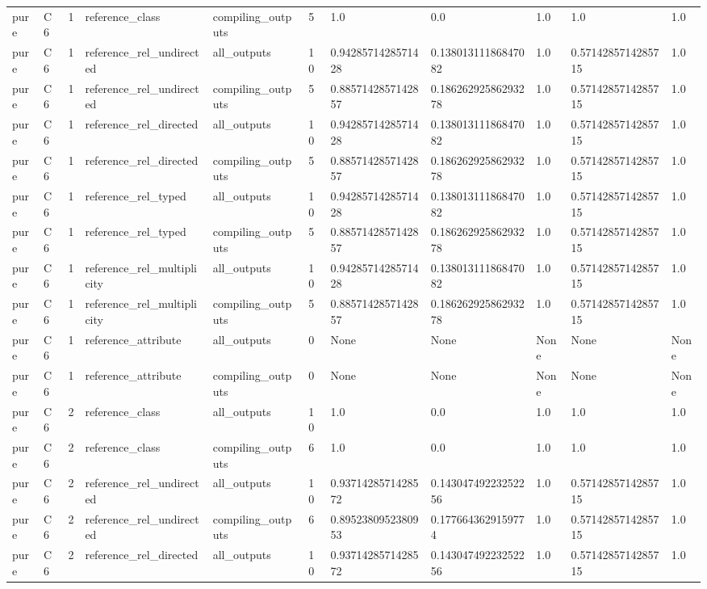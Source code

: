 \begin{tabular}{lllllllllll}
pure & C6 & 1 & reference\_class & compiling\_outputs & 5 & 1.0 & 0.0 & 1.0 & 1.0 & 1.0 \\
pure & C6 & 1 & reference\_rel\_undirected & all\_outputs & 10 & 0.9428571428571428 & 0.13801311186847082 & 1.0 & 0.5714285714285715 & 1.0 \\
pure & C6 & 1 & reference\_rel\_undirected & compiling\_outputs & 5 & 0.8857142857142857 & 0.18626292586293278 & 1.0 & 0.5714285714285715 & 1.0 \\
pure & C6 & 1 & reference\_rel\_directed & all\_outputs & 10 & 0.9428571428571428 & 0.13801311186847082 & 1.0 & 0.5714285714285715 & 1.0 \\
pure & C6 & 1 & reference\_rel\_directed & compiling\_outputs & 5 & 0.8857142857142857 & 0.18626292586293278 & 1.0 & 0.5714285714285715 & 1.0 \\
pure & C6 & 1 & reference\_rel\_typed & all\_outputs & 10 & 0.9428571428571428 & 0.13801311186847082 & 1.0 & 0.5714285714285715 & 1.0 \\
pure & C6 & 1 & reference\_rel\_typed & compiling\_outputs & 5 & 0.8857142857142857 & 0.18626292586293278 & 1.0 & 0.5714285714285715 & 1.0 \\
pure & C6 & 1 & reference\_rel\_multiplicity & all\_outputs & 10 & 0.9428571428571428 & 0.13801311186847082 & 1.0 & 0.5714285714285715 & 1.0 \\
pure & C6 & 1 & reference\_rel\_multiplicity & compiling\_outputs & 5 & 0.8857142857142857 & 0.18626292586293278 & 1.0 & 0.5714285714285715 & 1.0 \\
pure & C6 & 1 & reference\_attribute & all\_outputs & 0 & None & None & None & None & None \\
pure & C6 & 1 & reference\_attribute & compiling\_outputs & 0 & None & None & None & None & None \\
pure & C6 & 2 & reference\_class & all\_outputs & 10 & 1.0 & 0.0 & 1.0 & 1.0 & 1.0 \\
pure & C6 & 2 & reference\_class & compiling\_outputs & 6 & 1.0 & 0.0 & 1.0 & 1.0 & 1.0 \\
pure & C6 & 2 & reference\_rel\_undirected & all\_outputs & 10 & 0.9371428571428572 & 0.14304749223252256 & 1.0 & 0.5714285714285715 & 1.0 \\
pure & C6 & 2 & reference\_rel\_undirected & compiling\_outputs & 6 & 0.8952380952380953 & 0.1776643629159774 & 1.0 & 0.5714285714285715 & 1.0 \\
pure & C6 & 2 & reference\_rel\_directed & all\_outputs & 10 & 0.9371428571428572 & 0.14304749223252256 & 1.0 & 0.5714285714285715 & 1.0 \\

\end{tabular}
